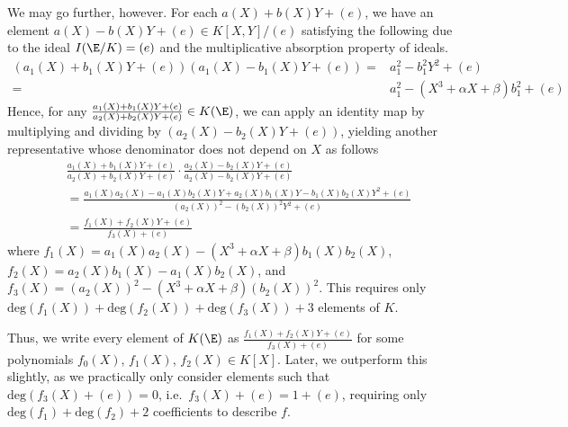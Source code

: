 \documentclass[11pt,letterpaper]{article}
\newcommand{\polys}{K[X,Y]}
\theoremstyle{definition}
\newcommand{\6}{\mathbf}
\newcommand{\7}{\mathcal}
\begin{document}
We may go further, however. For each $a(X) + b(X)Y + (e)$, we have an element $a(X) - b(X)Y + (e) \in \polys/(e)$ satisfying the following due to the ideal $I(\E/K) = (e)$ and the multiplicative absorption property of ideals.
\begin{align}
(a_1(X) + b_1(X)Y + (e))(a_1(X) - b_1(X)Y + (e)) =& a_1^2 - b_1^2Y^2 + (e) \\
=& a_1^2 - (X^3 + \alpha X + \beta)b_1^2 + (e)
\end{align}
Hence, for any $\frac{a_1(X)+b_1(X)Y + (e)}{a_2(X)+b_2(X)Y + (e)} \in K(\E)$, we can apply an identity map by multiplying and dividing by $(a_2(X) - b_2(X)Y + (e))$, yielding another representative whose denominator does not depend on $X$ as follows
\begin{align}
& \frac{a_1(X)+b_1(X)Y + (e)}{a_2(X)+b_2(X)Y + (e)} \cdot \frac{a_2(X)-b_2(X)Y + (e)}{a_2(X)-b_2(X)Y + (e)} \\ &= \frac{a_1(X)a_2(X) - a_1(X) b_2(X) Y + a_2(X)b_1(X) Y - b_1(X) b_2(X) Y^2 + (e)}{(a_2(X))^2 - (b_2(X))^2Y^2 + (e)} \\
&= \frac{f_1(X) + f_2(X)Y + (e)}{f_3(X) + (e)}
\end{align} where $f_1(X) = a_1(X) a_2(X) - (X^3 + \alpha X + \beta)b_1(X)b_2(X)$, $f_2(X) = a_2(X)b_1(X) - a_1(X) b_2(X)$, and $f_3(X) = (a_2(X))^2 - (X^3 + \alpha X + \beta)(b_2(X))^2$. This requires only $\text{deg}(f_1(X))+\text{deg}(f_2(X))+\text{deg}(f_3(X))+3$ elements of $K$.

Thus, we write every element of $K(\E)$ as $\frac{f_1(X) + f_2(X)Y + (e)}{f_3(X) + (e)}$ for some polynomials $f_0(X)$, $f_1(X)$, $f_2(X) \in K[X]$.
Later, we outperform this slightly, as we practically only consider elements such that $\text{deg}(f_3(X) + (e)) = 0$, i.e.\ $f_3(X) + (e) = 1 + (e)$, requiring only $\text{deg}(f_1)+\text{deg}(f_2)+2$ coefficients to describe $f$.
\end{document}

